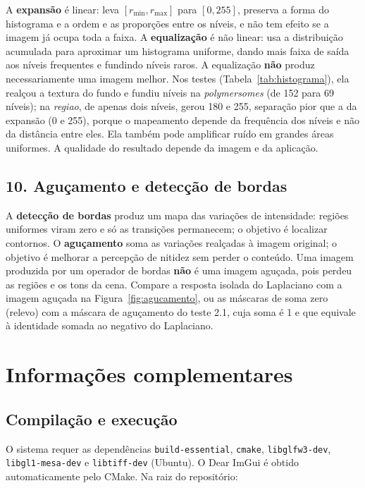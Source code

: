 \documentclass[11pt,a4paper]{article}
\begin{document}
A \textbf{expansão} é linear: leva $[r_{\min}, r_{\max}]$ para $[0, 255]$, preserva a forma do
histograma e a ordem e as proporções entre os níveis, e não tem efeito se a imagem já ocupa toda
a faixa. A \textbf{equalização} é não linear: usa a distribuição acumulada para aproximar um
histograma uniforme, dando mais faixa de saída aos níveis frequentes e fundindo níveis raros.
A equalização \textbf{não} produz necessariamente uma imagem melhor. Nos testes
(Tabela~\ref{tab:histograma}), ela realçou a textura do fundo e fundiu níveis na
\textit{polymersomes} (de 152 para 69 níveis); na \textit{regiao}, de apenas dois níveis, gerou
180 e 255, separação pior que a da expansão (0 e 255), porque o mapeamento depende da frequência
dos níveis e não da distância entre eles. Ela também pode amplificar ruído em grandes áreas
uniformes. A qualidade do resultado depende da imagem e da aplicação.

\subsection*{10. Aguçamento e detecção de bordas}

A \textbf{detecção de bordas} produz um mapa das variações de intensidade: regiões uniformes
viram zero e só as transições permanecem; o objetivo é localizar contornos. O
\textbf{aguçamento} soma as variações realçadas à imagem original; o objetivo é melhorar a
percepção de nitidez sem perder o conteúdo. Uma imagem produzida por um operador de bordas
\textbf{não} é uma imagem aguçada, pois perdeu as regiões e os tons da cena. Compare a resposta
isolada do Laplaciano com a imagem aguçada na Figura~\ref{fig:agucamento}, ou as máscaras de
soma zero (relevo) com a máscara de aguçamento do teste 2.1, cuja soma é 1 e que equivale à
identidade somada ao negativo do Laplaciano.

\section{Informações complementares}

\subsection*{Compilação e execução}

O sistema requer as dependências \texttt{build-essential}, \texttt{cmake}, \texttt{libglfw3-dev},
\texttt{libgl1-mesa-dev} e \texttt{libtiff-dev} (Ubuntu). O Dear ImGui é obtido automaticamente
pelo CMake. Na raiz do repositório:
\end{document}
